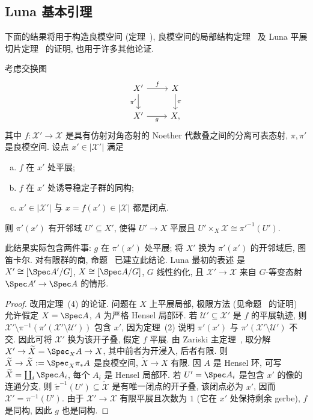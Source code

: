 \subsection{Luna 基本引理}\label{src:7.5.7-subsection}
下面的结果将用于构造良模空间 (定理~), 良模空间的局部结构定理~ 及 Luna 平展切片定理~ 的证明, 也用于许多其他论证.
\begin{theorem}\label{src:7.5.30}
考虑交换图
\begin{align}\label{src:7.5.31}
\begin{tikzcd}[ampersand replacement=\&]
\mathcal X'\arrow[r,"{f}"]\arrow[d,"{\pi'}"']\&\mathcal X\arrow[d,"{\pi}"]\\
X'\arrow[r,"{g}"']\&X,
\end{tikzcd}
\end{align}
其中 $f:\mathcal X'\to\mathcal X$ 是具有仿射对角态射的 Noether 代数叠之间的分离可表态射, $\pi,\pi'$ 是良模空间. 设点 $x'\in|\mathcal X'|$ 满足
\begin{enumerate}[(a)]
\item $f$ 在 $x'$ 处平展;
\item $f$ 在 $x'$ 处诱导稳定子群的同构;
\item $x'\in|\mathcal X'|$ 与 $x=f(x')\in|\mathcal X|$ 都是闭点.
\end{enumerate}
则 $\pi'(x')$ 有开邻域 $U'\subseteq X'$, 使得 $U'\to X$ 平展且 $U'\times_X\mathcal X\cong\pi'^{-1}(U')$.
\end{theorem}
\begin{remark}\label{src:7.5.32}
此结果实际包含两件事: $g$ 在 $\pi'(x')$ 处平展; 将 $X'$ 换为 $\pi'(x')$ 的开邻域后, 图  笛卡尔. 对有限群的商, 命题~ 已建立此结论. Luna 最初的表述 \cite[第 94 页]{Lun73} 是 $\mathcal X'\cong[\Spec A'/G]$, $\mathcal X\cong[\Spec A/G]$, $G$ 线性约化, 且 $\mathcal X'\to\mathcal X$ 来自 $G$-等变态射 $\Spec A'\to\Spec A$ 的情形.
\end{remark}
\begin{proof}
改用定理~(4) 的论证. 问题在 $X$ 上平展局部, 极限方法 (见命题~ 的证明) 允许假定 $X=\Spec A$, $A$ 为严格 Hensel 局部环. 若 $\mathcal U'\subseteq\mathcal X'$ 是 $f$ 的平展轨迹, 则 $\mathcal X'\setminus\pi^{-1}(\pi'(\mathcal X'\setminus\mathcal U'))$ 包含 $x'$, 因为定理~(2) 说明 $\pi'(x')$ 与 $\pi'(\mathcal X'\setminus\mathcal U')$ 不交. 因此可将 $\mathcal X'$ 换为该开子叠, 假定 $f$ 平展. 由 Zariski 主定理~, 取分解 $\mathcal X'\to\widetilde{\mathcal X}=\Spec_{\mathcal X}\mathcal A\to\mathcal X$, 其中前者为开浸入, 后者有限. 则 $\widetilde{\mathcal X}\to\widetilde X:=\Spec_X\pi_*\mathcal A$ 是良模空间, $\widetilde X\to X$ 有限. 因 $A$ 是 Hensel 环, 可写 $\widetilde X=\coprod_i\Spec A_i$, 每个 $A_i$ 是 Hensel 局部环. 若 $U'=\Spec A_i$ 是包含 $x'$ 的像的连通分支, 则 $\widetilde\pi^{-1}(U')\subseteq\widetilde{\mathcal X}$ 是有唯一闭点的开子叠, 该闭点必为 $x'$, 因而 $\mathcal X'=\pi^{-1}(U')$. 由于 $\mathcal X'\to\mathcal X$ 有限平展且次数为 $1$ (它在 $x'$ 处保持剩余 gerbe), $f$ 是同构, 因此 $g$ 也是同构.
\end{proof}
